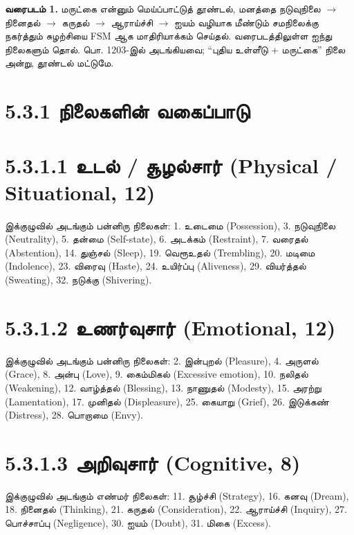 \documentclass[journal,10pt,twocolumn]{IEEEtran}
\begin{document}
\textbf{வரைபடம் 1.} மருட்கை என்னும் மெய்ப்பாட்டுத் தூண்டல், மனத்தை நடுவுநிலை
\(\rightarrow\) நினைதல் \(\rightarrow\) கருதல் \(\rightarrow\) ஆராய்ச்சி
\(\rightarrow\) ஐயம் வழியாக மீண்டும் சமநிலைக்கு நகர்த்தும் சுழற்சியை FSM ஆக
மாதிரியாக்கம் செய்தல். வரைபடத்திலுள்ள ஐந்து நிலைகளும் தொல். பொ. 1203-இல் அடங்கியவை;
“புதிய உள்ளீடு + மருட்கை” நிலை அன்று, தூண்டல் மட்டுமே.

\section{5.3.1 நிலைகளின்
வகைப்பாடு}\label{uxba8uxbb2uxb95uxbb3uxba9-uxbb5uxb95uxbaauxbaauxb9f}

\section{5.3.1.1 உடல் / சூழல்சார் (Physical / Situational,
12)}\label{uxb89uxb9fuxbb2-uxb9auxbb4uxbb2uxb9auxbb0-physical-situational-12}

இக்குழுவில் அடங்கும் பன்னிரு நிலைகள்: 1. உடைமை (Possession), 3. நடுவுநிலை
(Neutrality), 5. தன்மை (Self-state), 6. அடக்கம் (Restraint), 7. வரைதல்
(Abstention), 14. துஞ்சல் (Sleep), 19. வெரூஉதல் (Trembling), 20. மடிமை
(Indolence), 23. விரைவு (Haste), 24. உயிர்ப்பு (Aliveness), 29. வியர்த்தல்
(Sweating), 32. நடுக்கு (Shivering).

\section{5.3.1.2 உணர்வுசார் (Emotional,
12)}\label{uxb89uxba3uxbb0uxbb5uxb9auxbb0-emotional-12}

இக்குழுவில் அடங்கும் பன்னிரு நிலைகள்: 2. இன்புறல் (Pleasure), 4. அருளல் (Grace),
8. அன்பு (Love), 9. கைம்மிகல் (Excessive emotion), 10. நலிதல் (Weakening),
12. வாழ்த்தல் (Blessing), 13. நாணுதல் (Modesty), 15. அரற்று (Lamentation),
17. முனிதல் (Displeasure), 25. கையாறு (Grief), 26. இடுக்கண் (Distress), 28.
பொறாமை (Envy).

\section{5.3.1.3 அறிவுசார் (Cognitive,
8)}\label{uxb85uxbb1uxbb5uxb9auxbb0-cognitive-8}

இக்குழுவில் அடங்கும் எண்மர் நிலைகள்: 11. சூழ்ச்சி (Strategy), 16. கனவு (Dream),
18. நினைதல் (Thinking), 21. கருதல் (Consideration), 22. ஆராய்ச்சி (Inquiry),
27. பொச்சாப்பு (Negligence), 30. ஐயம் (Doubt), 31. மிகை (Excess).
\end{document}
